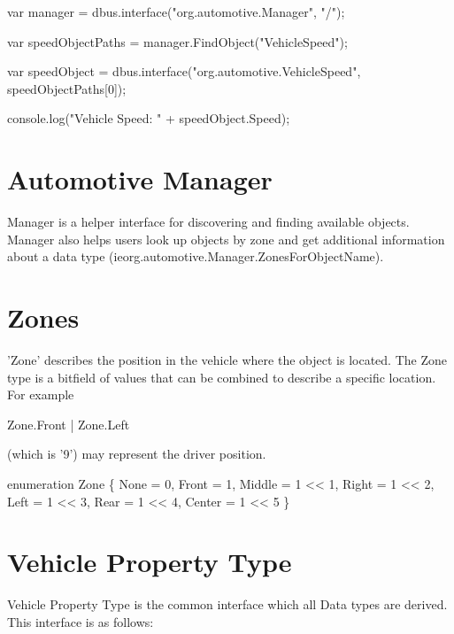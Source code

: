 \begin{DoxyCode}
var manager = dbus.interface(\textcolor{stringliteral}{"org.automotive.Manager"}, \textcolor{stringliteral}{"/"});

var speedObjectPaths = manager.FindObject(\textcolor{stringliteral}{"VehicleSpeed"});

var speedObject = dbus.interface(\textcolor{stringliteral}{"org.automotive.VehicleSpeed"}, speedObjectPaths[0]);

console.log(\textcolor{stringliteral}{"Vehicle Speed: "} + speedObject.Speed);
\end{DoxyCode}
 \hypertarget{index_automotive_manager}{}\section{Automotive Manager}\label{index_automotive_manager}
Manager is a helper interface for discovering and finding available objects. Manager also helps users look up objects by zone and get additional information about a data type (ieorg.\+automotive.\+Manager.\+Zones\+For\+Object\+Name). \hypertarget{index_zones}{}\section{Zones}\label{index_zones}
'Zone' describes the position in the vehicle where the object is located. The Zone type is a bitfield of values that can be combined to describe a specific location. For example


\begin{DoxyCode}
Zone.Front | Zone.Left
\end{DoxyCode}


(which is '9') may represent the driver position.


\begin{DoxyCode}
enumeration Zone \{
  None = 0,
  Front = 1,
  Middle = 1 << 1,
  Right = 1 << 2,
  Left = 1 << 3,
  Rear = 1 << 4,
  Center = 1 << 5
\}
\end{DoxyCode}
\hypertarget{index_vehicle_property_type}{}\section{Vehicle Property Type}\label{index_vehicle_property_type}
Vehicle Property Type is the common interface which all Data types are derived. This interface is as follows\+:


